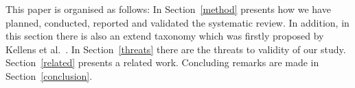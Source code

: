 




This paper is organised as follows: In Section~\ref{method} presents how we have planned, conducted, reported and validated the systematic review. In addition, in this section there is also an extend taxonomy which was firstly proposed by Kellens et al.~\cite{Kellens}. In Section~\ref{threats} there are the threats to validity of our study. Section~\ref{related} presents a related work. Concluding remarks are made in Section~\ref{conclusion}.